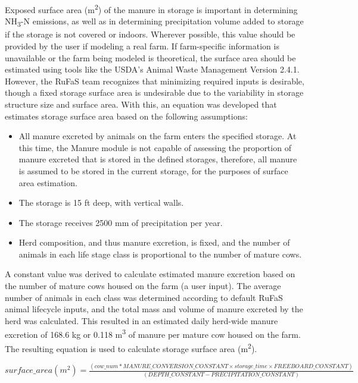 \begin{refsection}
Exposed surface area (m\textsuperscript{2}) of the manure in storage is important in determining NH\textsubscript{3}-N emissions, as well as in determining precipitation volume added to storage if the storage is not covered or indoors. Wherever possible, this value should be provided by the user if modeling a real farm. If farm-specific information is unavailable or the farm being modeled is theoretical, the surface area should be estimated using tools like the USDA's Animal Waste Management Version 2.4.1. However, the RuFaS team recognizes that minimizing required inputs is desirable, though a fixed storage surface area is undesirable due to the variability in storage structure size and surface area. With this, an equation was developed that estimates storage surface area based on the following assumptions:
    \begin{itemize}
        \item All manure excreted by animals on the farm enters the specified storage. At this time, the Manure module is not capable of assessing the proportion of manure excreted that is stored in the defined storages, therefore, all manure is assumed to be stored in the current storage, for the purposes of surface area estimation.
        \item The storage is 15 ft deep, with vertical walls.
        \item The storage receives 2500 mm of precipitation per year. 
        \item Herd composition, and thus manure excretion, is fixed, and the number of animals in each life stage class is proportional to the number of mature cows. 
    \end{itemize}

A constant value was derived to calculate estimated manure excretion based on the number of mature cows housed on the farm (a user input). The average number of animals in each class was determined according to default RuFaS animal lifecycle inputs, and the total mass and volume of manure excreted by the herd was calculated. This resulted in an estimated daily herd-wide manure excretion of 168.6 kg or 0.118  m\textsuperscript{3} of manure per mature cow housed on the farm. The resulting equation is used to calculate storage surface area (m\textsuperscript{2}).
\vspace{0.5cm}

    \begin{center}
        \(surface\_area (m^2) = \frac{(cow\_num * MANURE\_CONVERSION\_CONSTANT \times storage\_time \times FREEBOARD\_CONSTANT) }{ (DEPTH\_CONSTANT - PRECIPITATION\_CONSTANT)} \)
    \end{center}
        \vspace{0.5cm} 
    

\end{refsection}
